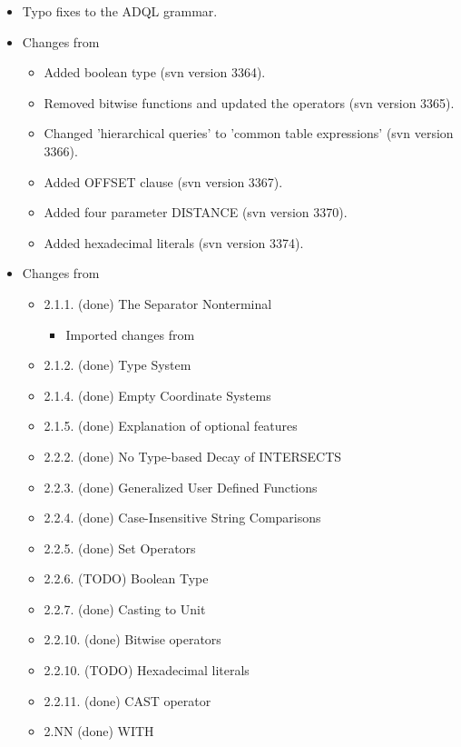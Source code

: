 \documentclass[11pt,a4paper]{ivoa}
\begin{document}
\begin{itemize}
    \item Typo fixes to the ADQL grammar.

    \item Changes from \citet{std:ADQL-20150601}
        \begin{itemize}

            \item Added boolean type (svn version 3364).

            \item Removed bitwise functions and updated the operators (svn version 3365).

            \item Changed 'hierarchical queries' to 'common table expressions' (svn version 3366).

            \item Added OFFSET clause (svn version 3367).

            \item Added four parameter DISTANCE (svn version 3370).

            \item Added hexadecimal literals (svn version 3374).

        \end{itemize}

    \item Changes from \citet{note:TAPNotes}
        \begin{itemize}

            \item 2.1.1.  (done) The Separator Nonterminal
            \begin{itemize}
                \item Imported changes from \citet{note:ADQL2Err1}
            \end{itemize}
                
            \item 2.1.2.  (done) Type System
            \item 2.1.4.  (done) Empty Coordinate Systems
            \item 2.1.5.  (done) Explanation of optional features
            \item 2.2.2.  (done) No Type-based Decay of INTERSECTS
            \item 2.2.3.  (done) Generalized User Defined Functions
            \item 2.2.4.  (done) Case-Insensitive String Comparisons
            \item 2.2.5.  (done) Set Operators
            \item 2.2.6.  (TODO) Boolean Type
            \item 2.2.7.  (done) Casting to Unit
            \item 2.2.10. (done) Bitwise operators
            \item 2.2.10. (TODO) Hexadecimal literals
            \item 2.2.11. (done) CAST operator
            \item 2.NN    (done) WITH


\end{itemize}
\end{itemize}
\end{document}
